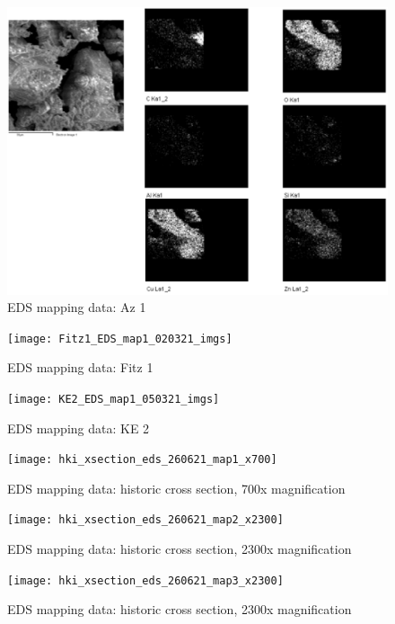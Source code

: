 \begin{figure}[H]
\centering
  \includegraphics[width=0.9\linewidth]{Az1_EDS_map3_250221_imgs}
\caption[EDS mapping data: Az 1]{EDS mapping data: Az 1}
\label{fig:az1_map3}
\end{figure}

\begin{figure}[H]
\centering
  \texttt{[image: Fitz1\_EDS\_map1\_020321\_imgs]}
\caption[EDS mapping data: Fitz 1]{EDS mapping data: Fitz 1}
\label{fig:fitz1_map2}
\end{figure}

\begin{figure}[H]
\centering
  \texttt{[image: KE2\_EDS\_map1\_050321\_imgs]}
\caption[EDS mapping data: KE 2]{EDS mapping data: KE 2}
\label{fig:ke2_map2}
\end{figure}

\begin{figure}[H] %
\centering
  \texttt{[image: hki\_xsection\_eds\_260621\_map1\_x700]}
\caption[EDS mapping data: historic cross section, 700x magnification]{EDS mapping data: historic cross section, 700x magnification}
\label{fig:xsection_map3}
\end{figure}

\begin{figure}[H] %
\centering
  \texttt{[image: hki\_xsection\_eds\_260621\_map2\_x2300]}
\caption[EDS mapping data: historic cross section, 700x magnification]{EDS mapping data: historic cross section, 2300x magnification}
\label{fig:xsection_map4}
\end{figure}

\begin{figure}[H] %
\centering
  \texttt{[image: hki\_xsection\_eds\_260621\_map3\_x2300]}
\caption[EDS mapping data: historic cross section, 2300x magnification]{EDS mapping data: historic cross section, 2300x magnification}
\label{fig:xsection_map5}
\end{figure}

